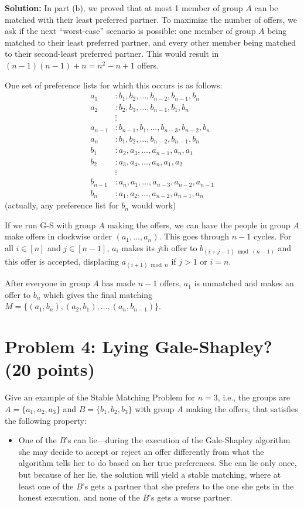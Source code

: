 \documentclass[12pt]{article}
\begin{document}
\begin{enumerate}
\textbf{Solution:} In part (b), we proved that at most 1 member of group $A$ can be matched with their least preferred partner. To maximize the number of offers, we ask if the next ``worst-case'' scenario is possible: one member of group $A$ being matched to their least preferred partner, and every other member being matched to their second-least preferred partner. This would result in $(n-1)(n-1)+n=n^2-n+1$ offers.

One set of preference lists for which this occurs is as follows:
\begin{align*}
a_1 &: b_1,b_2,\ldots,b_{n-2},b_{n-1},b_n\\
a_2 &: b_2,b_3,\ldots,b_{n-1},b_1,b_n\\
&\vdots\\
a_{n-1} &: b_{n-1},b_1,\ldots,b_{n-3},b_{n-2},b_n\\
a_n &: b_1,b_2,\ldots,b_{n-2},b_{n-1},b_n\\[4pt]
b_1 &: a_2,a_3,\ldots,a_{n-1},a_n,a_1\\
b_2 &: a_3,a_4,\ldots,a_n,a_1,a_2\\
&\vdots\\
b_{n-1} &: a_n,a_1,\ldots,a_{n-3},a_{n-2},a_{n-1}\\
b_n &: a_1,a_2,\ldots,a_{n-2},a_{n-1},a_n
\end{align*}
(actually, any preference list for $b_n$ would work)

If we run G-S with group $A$ making the offers, we can have the people in group $A$ make offers in clockwise order $(a_1,\ldots,a_n)$. This goes through $n-1$ cycles. For all $i\in[n]$ and $j\in[n-1]$, $a_i$ makes its $j$th offer to $b_{(i+j-1)\bmod (n-1)}$ and this offer is accepted, displacing $a_{(i+1)\bmod n}$ if $j>1$ or $i=n$.

After everyone in group $A$ has made $n-1$ offers, $a_1$ is unmatched and makes an offer to $b_n$ which gives the final matching $M=\{(a_1,b_n),(a_2,b_1),\ldots,(a_n,b_{n-1})\}$.
\end{enumerate}

\section*{Problem 4: Lying Gale-Shapley? (20 points)}
Give an example of the Stable Matching Problem for $n=3$, i.e., the groups are $A=\{a_1,a_2,a_3\}$ and $B=\{b_1,b_2,b_3\}$ with group $A$ making the offers, that satisfies the following property:
\begin{itemize}
\item One of the $B$'s can lie---during the execution of the Gale-Shapley algorithm she may decide to accept or reject an offer differently from what the algorithm tells her to do based on her true preferences. She can lie only once, but because of her lie, the solution will yield a stable matching, where at least one of the $B$'s gets a partner that she prefers to the one she gets in the honest execution, and none of the $B$'s gets a worse partner.
\end{itemize}
\end{document}
